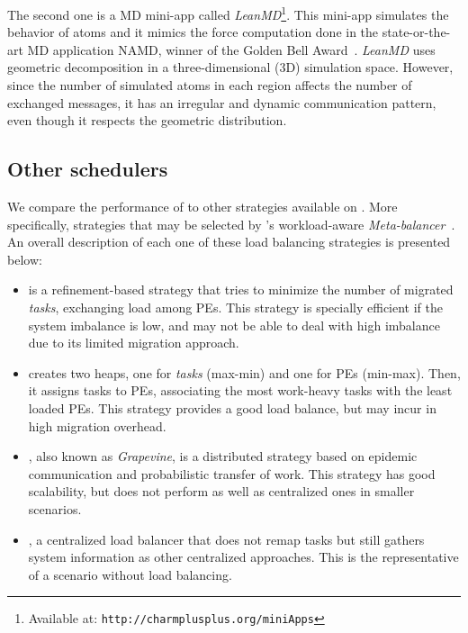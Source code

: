 The second one is a MD mini-app called \textit{LeanMD}\footnote{Available at: \texttt{http://charmplusplus.org/miniApps}}.
This mini-app simulates the behavior of atoms and it mimics the force computation done in the state-or-the-art MD application NAMD, winner of the Golden Bell Award~\cite{namd,namd0}.
\textit{LeanMD} uses geometric decomposition in a three-dimensional ($3$D) simulation space.
However, since the number of simulated atoms in each region affects the number of exchanged messages, it has an irregular and dynamic communication pattern, even though it respects the geometric distribution.

\subsection{Other schedulers}

We compare the performance of \packdrop to other strategies available on \charm.
More specifically, strategies that may be selected by \charm 's workload-aware \textit{Meta-balancer}~\cite{MenonPHD}.
An overall description of each one of these load balancing strategies is presented below:

\begin{itemize}
	\item {} is a refinement-based strategy that tries to minimize the number of migrated \textit{tasks}, exchanging load among PEs.
This strategy is specially efficient if the system imbalance is low, and may not be able to deal with high imbalance due to its limited migration approach.
	\item \greedylb creates two heaps, one for \textit{tasks} (max-min) and one for PEs (min-max). 
Then, it assigns tasks to PEs, associating the most work-heavy tasks with the least loaded PEs.
This strategy provides a good load balance, but may incur in high migration overhead.
    \item \distributedlb, also known as \textit{Grapevine}, is a distributed strategy based on epidemic communication and probabilistic transfer of work.
   This strategy has good scalability, but does not perform as well as centralized ones in smaller scenarios.
   \item \dummylb, a centralized load balancer that does not remap tasks but still gathers system information as other centralized approaches.
   This is the representative of a scenario without load balancing.

\end{itemize}



